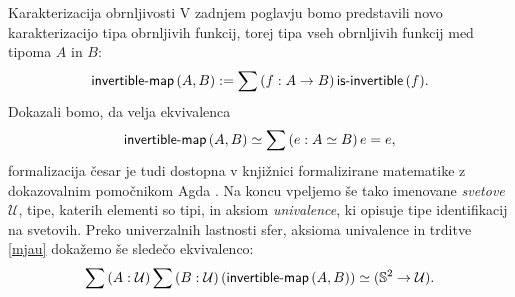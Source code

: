\documentclass[a4paper, slovene]{article}
\begin{document}
\begin{section}{Karakterizacija obrnljivosti}
  V zadnjem poglavju bomo predstavili novo karakterizacijo tipa obrnljivih funkcij, torej
  tipa vseh obrnljivih funkcij med tipoma \(A\) in \(B\):
  \begin{equation}
    \label{mjau}
      \textnormal{\textsf{invertible-map}}\,(A, B) := \sum \left( f : A \to B \right) \textnormal{\textsf{is-invertible}}\,(f).
  \end{equation}
  Dokazali bomo, da velja ekvivalenca
  \[\textnormal{\textsf{invertible-map}}\,(A, B) \simeq \sum \left( e : A \simeq B \right) e = e,\]
  formalizacija česar je tudi dostopna v knjižnici formalizirane matematike z dokazovalnim
  pomočnikom Agda \cite{agda-unimath}.
  Na koncu vpeljemo še tako imenovane \emph{svetove} \(\mathcal{U}\), tipe, katerih elementi so
  tipi, in aksiom \emph{univalence}, ki opisuje tipe identifikacij na svetovih.
  Preko univerzalnih lastnosti sfer, aksioma univalence in trditve \ref{mjau}
  dokažemo še sledečo ekvivalenco:
  \[\sum \left( A : \mathcal{U} \right) \sum \left( B : \mathcal{U} \right) (\textnormal{\textsf{invertible-map}}\,(A, B)) \simeq
    (\mathbb{S}^{2} \to \mathcal{U}).\]
\end{section}
\printbibliography
\end{document}
